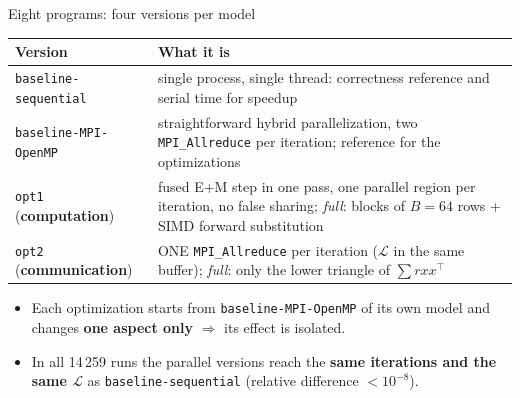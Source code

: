 \documentclass[aspectratio=169,10pt]{beamer}
\newcommand{\vseq}{\texttt{baseline-sequential}}
\newcommand{\vbase}{\texttt{baseline-MPI-OpenMP}}
\newcommand{\optone}{\texttt{opt1}}
\newcommand{\opttwo}{\texttt{opt2}}
\begin{document}
\begin{frame}{Eight programs: four versions per model}
\small
\begin{tabular}{lp{}}
\toprule
\textbf{Version} & \textbf{What it is} \\
\midrule
\vseq{} & single process, single thread: correctness reference and serial time for speedup \\
\vbase{} & straightforward hybrid parallelization, two \texttt{MPI\_Allreduce} per iteration; reference for the optimizations \\
\optone{} (\textbf{computation}) & fused E+M step in one pass, one parallel region per iteration, no false sharing; \emph{full}: blocks of $B=64$ rows + SIMD forward substitution \\
\opttwo{} (\textbf{communication}) & ONE \texttt{MPI\_Allreduce} per iteration ($\mathcal{L}$ in the same buffer); \emph{full}: only the lower triangle of $\sum r xx^\top$ \\
\bottomrule
\end{tabular}

\bigskip
\begin{itemize}
\item Each optimization starts from \vbase{} of its own model and changes \textbf{one aspect only} $\Rightarrow$ its effect is isolated.
\item In all 14\,259 runs the parallel versions reach the \textbf{same iterations and the same $\mathcal{L}$} as \vseq{} (relative difference $<10^{-8}$).
\end{itemize}
\end{frame}
\end{document}
